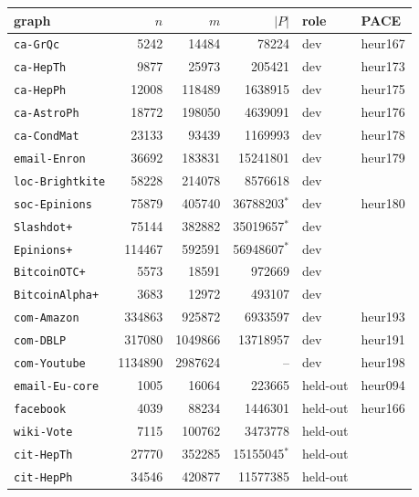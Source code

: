 \begin{tabular}{lrrrll}
\toprule
graph & $n$ & $m$ & $|P|$ & role & PACE \\
\midrule
\texttt{ca-GrQc} & \num{5242} & \num{14484} & \num{78224} & dev & heur167 \\
\texttt{ca-HepTh} & \num{9877} & \num{25973} & \num{205421} & dev & heur173 \\
\texttt{ca-HepPh} & \num{12008} & \num{118489} & \num{1638915} & dev & heur175 \\
\texttt{ca-AstroPh} & \num{18772} & \num{198050} & \num{4639091} & dev & heur176 \\
\texttt{ca-CondMat} & \num{23133} & \num{93439} & \num{1169993} & dev & heur178 \\
\texttt{email-Enron} & \num{36692} & \num{183831} & \num{15241801} & dev & heur179 \\
\texttt{loc-Brightkite} & \num{58228} & \num{214078} & \num{8576618} & dev &  \\
\texttt{soc-Epinions} & \num{75879} & \num{405740} & \num{36788203}$^\ast$ & dev & heur180 \\
\texttt{Slashdot+} & \num{75144} & \num{382882} & \num{35019657}$^\ast$ & dev &  \\
\texttt{Epinions+} & \num{114467} & \num{592591} & \num{56948607}$^\ast$ & dev &  \\
\texttt{BitcoinOTC+} & \num{5573} & \num{18591} & \num{972669} & dev &  \\
\texttt{BitcoinAlpha+} & \num{3683} & \num{12972} & \num{493107} & dev &  \\
\texttt{com-Amazon} & \num{334863} & \num{925872} & \num{6933597} & dev & heur193 \\
\texttt{com-DBLP} & \num{317080} & \num{1049866} & \num{13718957} & dev & heur191 \\
\texttt{com-Youtube} & \num{1134890} & \num{2987624} & -- & dev & heur198 \\
\midrule
\texttt{email-Eu-core} & \num{1005} & \num{16064} & \num{223665} & held-out & heur094 \\
\texttt{facebook} & \num{4039} & \num{88234} & \num{1446301} & held-out & heur166 \\
\texttt{wiki-Vote} & \num{7115} & \num{100762} & \num{3473778} & held-out &  \\
\texttt{cit-HepTh} & \num{27770} & \num{352285} & \num{15155045}$^\ast$ & held-out &  \\
\texttt{cit-HepPh} & \num{34546} & \num{420877} & \num{11577385} & held-out &  \\

\end{tabular}
